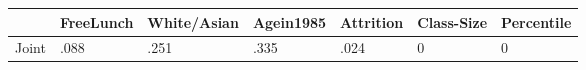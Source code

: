 \begin{table}[htbp]
\begin{tabular}{lllllll} \hline \hline
 & FreeLunch  & White/Asian  & Agein1985  & Attrition  & Class-Size  & Percentile  \\  \hline 
Joint & .088 & .251 & .335 & .024 & 0 & 0 \\  
\hline \hline \end{tabular}
\end{table}
